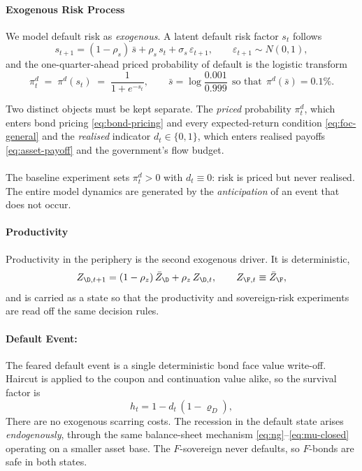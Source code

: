 \paragraph{Exogenous Risk Process}

We model default risk as \emph{exogenous}. A latent default risk factor $s_t$ follows
\begin{equation}
s_{t+1}=(1-\rho_s)\,\bar s+\rho_s\,s_t+\sigma_s\,\varepsilon_{t+1},
\qquad \varepsilon_{t+1}\sim N(0,1),
\label{eq:s-process}
\end{equation}
and the one-quarter-ahead priced probability of default is the logistic transform
\begin{equation}
\pi^{d}_t\;=\;\pi^{d}(s_t)\;=\;\frac{1}{1+e^{-s_t}},
\qquad \bar s=\log\frac{0.001}{0.999}\ \ \text{so that}\ \ \pi^{d}(\bar s)=0.1\%.
\label{eq:pd}
\end{equation}

Two distinct objects must be kept separate. The \emph{priced} probability $\pi^{d}_t$, which enters bond pricing \eqref{eq:bond-pricing} and every expected-return condition \eqref{eq:foc-general} and the \emph{realised} indicator $d_t\in\{0,1\}$, which enters realised payoffs \eqref{eq:asset-payoff} and the government's flow budget.\\
\\
The baseline experiment sets $\pi^{d}_t>0$ with $d_t\equiv0$: risk is priced but
never realised. The entire model dynamics are generated by the \emph{anticipation} of an event that does not occur.

\paragraph{Productivity}

Productivity in the periphery is the second exogenous driver. It is deterministic,
\begin{equation}
Z_{\D,t+1}=(1-\rho_z)\,\bar Z_\D+\rho_z\,Z_{\D,t},
\qquad Z_{\F,t}\equiv\bar Z_\F,
\label{eq:z-process}
\end{equation}
and is carried as a state so that the productivity and sovereign-risk experiments
are read off the same decision rules.

\paragraph{Default Event:}
The feared default event is a single deterministic bond face value write-off. Haircut is applied to the coupon and continuation value alike, so the survival factor is
\begin{equation}
h_t=1-d_t\,(1-\varrho_D), 
\end{equation}
There are no exogenous scarring costs. The recession in the default state arises \emph{endogenously}, through the same balance-sheet mechanism
\eqref{eq:ng}--\eqref{eq:mu-closed} operating on a smaller asset base. The $F$-sovereign never defaults, so $F$-bonds are safe in both states.

